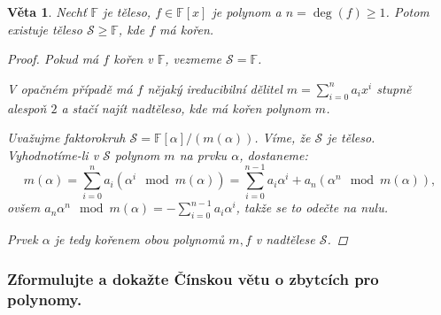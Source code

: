 \documentclass[10pt,a4paper]{article}
\newtheorem{veta}{Věta}
\newcommand{\F}{{\mathbb{F}}}       %
\begin{document}
\begin{veta}\normalfont
    Nechť $\F$ je těleso, $f\in \F[x]$ je polynom a $n=\deg(f)\geq 1$. Potom existuje těleso $\mathcal{S} \geq \F$, kde $f$ má kořen.
    \begin{proof}
        Pokud má $f$ kořen v $\F$, vezmeme $\mathcal{S} = \F$. 
        
        V opačném případě má $f$ nějaký ireducibilní dělitel $m =\sum_{i=0}^{n}a_ix^i$ stupně alespoň $2$ a stačí najít nadtěleso, kde má kořen polynom $m$. 
        
        Uvažujme faktorokruh $\mathcal{S} = \F[\alpha]/(m(\alpha))$. 
        Víme, že $\mathcal{S}$ je těleso. 
        Vyhodnotíme-li v $\mathcal{S}$ polynom $m$ na prvku $\alpha$, dostaneme:
        \[
            m(\alpha) = \sum_{i=0}^{n}a_i(\alpha^i \mod m(\alpha)) =\sum_{i=0}^{n-1}a_i\alpha^i + a_n(\alpha^n \mod m(\alpha)),
        \]
        ovšem $a_n\alpha^n \mod m(\alpha) = - \sum_{i=0}^{n-1}a_i\alpha^i$, takže se to odečte na nulu. 
        
        Prvek $\alpha$ je tedy kořenem obou polynomů $m, f$ v nadtělese $\mathcal{S}$.
    \end{proof}
\end{veta}

\subsubsection{Zformulujte a dokažte Čínskou větu o zbytcích pro polynomy.}
\end{document}
